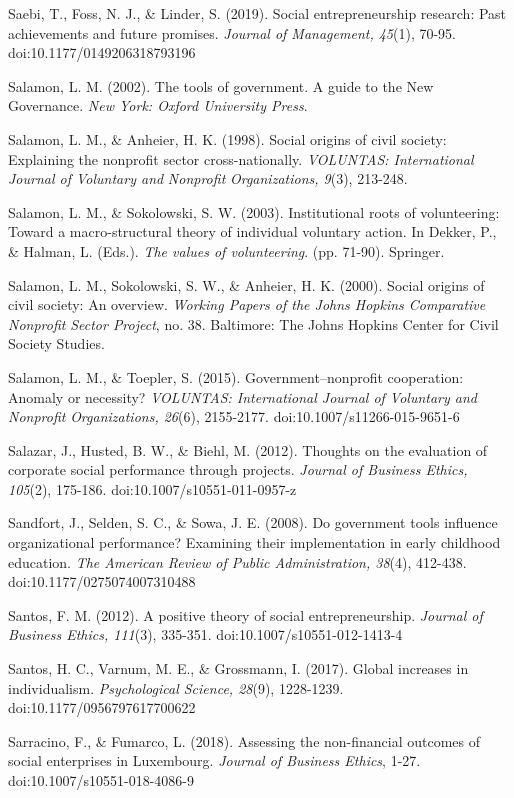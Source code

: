 \documentclass{article}
\begin{document}
Saebi, T., Foss, N. J., \& Linder, S. (2019). Social entrepreneurship research: Past achievements and future promises. \emph{Journal of Management, 45}(1), 70-95. doi:10.1177/0149206318793196

Salamon, L. M. (2002). The tools of government. A guide to the New Governance. \emph{New York: Oxford University Press}. 

Salamon, L. M., \& Anheier, H. K. (1998). Social origins of civil society: Explaining the nonprofit sector cross-nationally. \emph{VOLUNTAS: International Journal of Voluntary and }\emph{Nonprofit}\emph{ Organizations, 9}(3), 213-248. 

Salamon, L. M., \& Sokolowski, S. W. (2003). Institutional roots of volunteering: Toward a macro-structural theory of individual voluntary action. In Dekker, P., \& Halman, L. (Eds.). \emph{The values of volunteering}. (pp. 71-90). Springer.

Salamon, L. M., Sokolowski, S. W., \& Anheier, H. K. (2000). Social origins of civil society: An overview. \emph{Working Papers of the Johns Hopkins Comparative }\emph{Nonprofit}\emph{ Sector Project}, no. 38. Baltimore: The Johns Hopkins Center for Civil Society Studies.

Salamon, L. M., \& Toepler, S. (2015). Government--nonprofit cooperation: Anomaly or necessity? \emph{VOLUNTAS: International Journal of Voluntary and }\emph{Nonprofit}\emph{ Organizations, 26}(6), 2155-2177. doi:10.1007/s11266-015-9651-6

Salazar, J., Husted, B. W., \& Biehl, M. (2012). Thoughts on the evaluation of corporate social performance through projects. \emph{Journal of Business Ethics, 105}(2), 175-186. doi:10.1007/s10551-011-0957-z

Sandfort, J., Selden, S. C., \& Sowa, J. E. (2008). Do government tools influence organizational performance? Examining their implementation in early childhood education. \emph{The American Review of Public Administration, 38}(4), 412-438. doi:10.1177/0275074007310488

Santos, F. M. (2012). A positive theory of social entrepreneurship. \emph{Journal of Business Ethics, 111}(3), 335-351. doi:10.1007/s10551-012-1413-4

Santos, H. C., Varnum, M. E., \& Grossmann, I. (2017). Global increases in individualism. \emph{Psychological Science, 28}(9), 1228-1239. doi:10.1177/0956797617700622

Sarracino, F., \& Fumarco, L. (2018). Assessing the non-financial outcomes of social enterprises in Luxembourg. \emph{Journal of Business Ethics}, 1-27. doi:10.1007/s10551-018-4086-9
\end{document}
